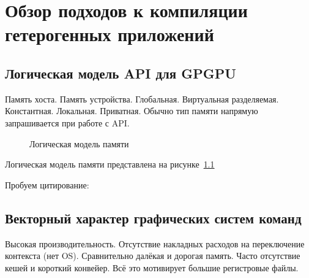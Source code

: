 \chapter{Обзор подходов к компиляции гетерогенных приложений}\label{ch:overview}

\section{Логическая модель API для GPGPU}\label{sec:overview/api}

Память хоста.
Память устройства.
Глобальная.
Виртуальная разделяемая.
Константная.
Локальная.
Приватная.
Обычно тип памяти напрямую запрашивается при работе с API.

\begin{figure}[ht]
    \caption{Логическая модель памяти}\label{fig:logical-memory}
\end{figure}

Логическая модель памяти представлена на рисунке~\cref{fig:logical-memory}

Пробуем цитирование: \cite{Gosele1999161}

\section{Векторный характер графических систем команд}\label{sec:overview/hw}

Высокая производительность.
Отсутствие накладных расходов на переключение контекста (нет OS).
Сравнительно далёкая и дорогая память.
Часто отсутствие кешей и короткий конвейер.
Всё это мотивирует большие регистровые файлы.

